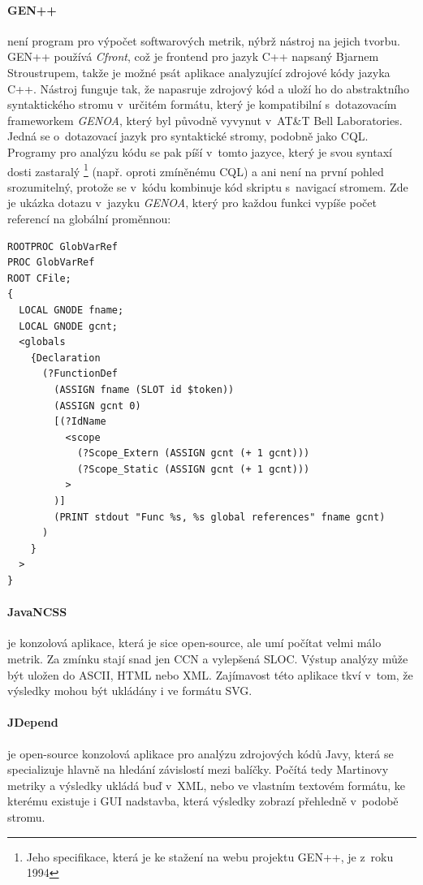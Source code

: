 \documentclass[11pt,twoside,a4paper]{book}
\begin{document}
\paragraph{GEN++}\cite{GENpp} není program pro výpočet softwarových metrik, nýbrž nástroj na jejich tvorbu.
GEN++ používá \textit{Cfront}, což je frontend pro jazyk C++ napsaný Bjarnem Stroustrupem, takže je možné psát aplikace analyzující zdrojové kódy jazyka C++.
Nástroj funguje tak, že napasruje zdrojový kód a uloží ho do abstraktního syntaktického stromu v~určitém formátu, který je kompatibilní s~dotazovacím frameworkem
\textit{GENOA}, který byl původně vyvynut v~AT\&T Bell Laboratories. Jedná se o~dotazovací jazyk pro syntaktické stromy, podobně jako CQL.
Programy pro analýzu kódu se pak píší v~tomto jazyce, který je svou syntaxí dosti zastaralý
\footnote{Jeho specifikace, která je ke stažení na webu projektu GEN++, je z~roku 1994} (např. oproti zmíněnému CQL)
a ani není na první pohled srozumitelný, protože se v~kódu kombinuje kód skriptu s~navigací stromem.
Zde je ukázka dotazu v~jazyku \textit{GENOA}, který pro každou funkci vypíše počet referencí na globální proměnnou:
\begin{verbatim}
ROOTPROC GlobVarRef
PROC GlobVarRef
ROOT CFile;
{
  LOCAL GNODE fname;
  LOCAL GNODE gcnt;
  <globals
    {Declaration
      (?FunctionDef
        (ASSIGN fname (SLOT id $token))
        (ASSIGN gcnt 0)
        [(?IdName
          <scope
            (?Scope_Extern (ASSIGN gcnt (+ 1 gcnt)))
            (?Scope_Static (ASSIGN gcnt (+ 1 gcnt)))
          >
        )]
        (PRINT stdout "Func %s, %s global references" fname gcnt)
      )
    }
  >
}
\end{verbatim}


\paragraph{JavaNCSS}\cite{JavaNCSS} je konzolová aplikace, která je sice open-source, ale umí počítat velmi málo metrik. Za zmínku stají snad jen CCN a vylepšená SLOC.
Výstup analýzy může být uložen do ASCII, HTML nebo XML. Zajímavost této aplikace tkví v~tom, že výsledky mohou být ukládány i ve formátu SVG.

\paragraph{JDepend}\cite{JDepend} je open-source konzolová aplikace pro analýzu zdrojových kódů Javy, která se specializuje hlavně na hledání závislostí
mezi balíčky. Počítá tedy Martinovy metriky a výsledky ukládá buď v~XML, nebo ve vlastním textovém formátu, ke kterému existuje i GUI nadstavba,
která výsledky zobrazí přehledně v~podobě stromu.
\end{document}
